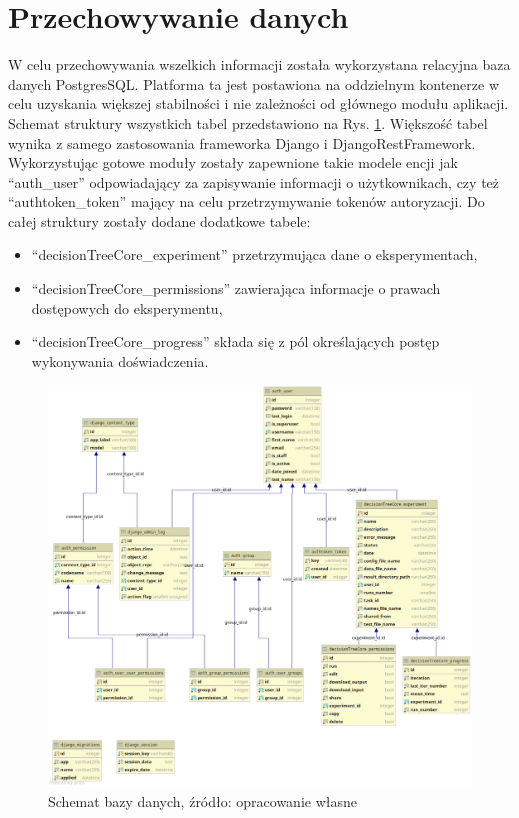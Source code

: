 \section{Przechowywanie danych}
W celu przechowywania wszelkich informacji została wykorzystana relacyjna baza danych PostgresSQL. Platforma ta jest postawiona na oddzielnym kontenerze w celu uzyskania większej stabilności i nie zależności od głównego modułu aplikacji. Schemat struktury wszystkich tabel przedstawiono na Rys. \ref{rys5_database_schema}. Większość tabel wynika z samego zastosowania frameworka Django i DjangoRestFramework. Wykorzystując gotowe moduły zostały zapewnione takie modele encji jak \enquote{auth\_user} odpowiadający za zapisywanie informacji o użytkownikach, czy też \enquote{authtoken\_token} mający na celu przetrzymywanie tokenów autoryzacji. Do całej struktury zostały dodane dodatkowe tabele:
\begin{itemize}
	\item \enquote{decisionTreeCore\_experiment} przetrzymująca dane o eksperymentach,  
	\item \enquote{decisionTreeCore\_permissions} zawierająca informacje o prawach dostępowych do eksperymentu,
	\item \enquote{decisionTreeCore\_progress} składa się z pól określających postęp wykonywania doświadczenia.
\end{itemize}



\begin{figure}[htb]
	\centering
	\includegraphics[angle=270, width=16cm]{grafika/database_schema.eps}
	\caption{Schemat bazy danych, źródło: opracowanie własne}
	\label{rys5_database_schema}
\end{figure}

